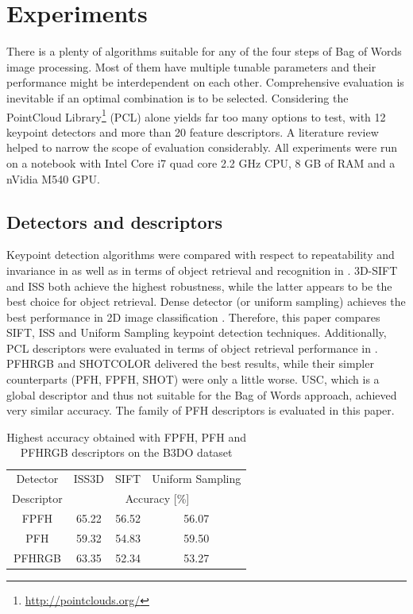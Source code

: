 \documentclass[12pt]{article}
\begin{document}
\section{ Experiments }
  There is a plenty of algorithms suitable for any of the four steps of Bag of 
Words image processing. Most of them have multiple tunable parameters and their 
performance might be interdependent on each other. Comprehensive evaluation is 
inevitable if an optimal combination is to be selected. Considering the 
PointCloud Library\footnote{\url{http://pointclouds.org/}} (PCL) alone yields 
far too many options to test, with 12 keypoint detectors and more than 20 
feature descriptors. A literature review helped to narrow the scope of 
evaluation considerably. All experiments were run on a notebook with Intel Core 
i7 quad core 2.2 GHz CPU, 8 GB of RAM and a nVidia M540 GPU. 

  \subsection{Detectors and descriptors}
    Keypoint detection algorithms were compared with respect to repeatability 
and invariance in \cite{pcl_keypoint_comparision} as well as in terms of object 
retrieval and recognition in \cite{3d_keypoint_eval}. 3D-SIFT and ISS both 
achieve the highest robustness, while the latter appears to be the best choice 
for object retrieval. Dense detector (or uniform sampling) achieves the best 
performance in 2D image classification \cite{tsai2012bag}. Therefore, this 
paper compares SIFT, ISS and Uniform Sampling keypoint detection techniques. 
Additionally, PCL descriptors were evaluated in terms of object retrieval 
performance in \cite{pcl_features}. PFHRGB and SHOTCOLOR delivered the best 
results, while their simpler counterparts (PFH, FPFH, SHOT) were only a little 
worse. USC, which is a global descriptor and thus not suitable for the Bag of 
Words approach, achieved very similar accuracy. The family of PFH descriptors 
is evaluated in this paper.
    
    \begin{table}[!hbtp]
    \centering
      \caption{Highest accuracy obtained with FPFH, PFH and PFHRGB descriptors 
on the B3DO dataset}
      \label{tab:desc_b3do}
     \begin{tabular}{*4c}
     \toprule
       Detector & ISS3D & SIFT & Uniform Sampling  \\ 
       Descriptor & \multicolumn{3}{c}{Accuracy {[\%]}} \\
     \midrule
       FPFH & 65.22 &  56.52 & 56.07  \\ 
       PFH & 59.32 &  54.83 & 59.50 \\
       PFHRGB & 63.35 & 52.34 & 53.27 \\
       
   \bottomrule
    \end{tabular}
    \end{table}
\end{document}
